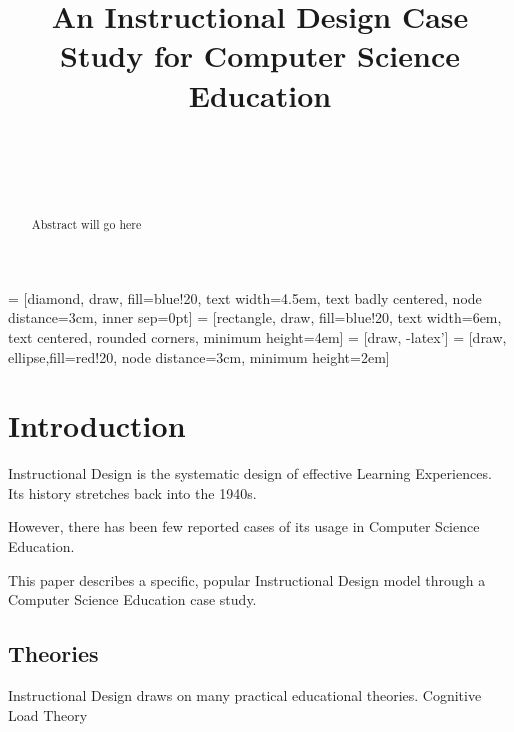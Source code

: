\documentclass{acm_proc_article-sp}
\begin{document}
 = [diamond, draw, fill=blue!20, 
    text width=4.5em, text badly centered, node distance=3cm, inner sep=0pt]
 = [rectangle, draw, fill=blue!20, 
    text width=6em, text centered, rounded corners, minimum height=4em]
 = [draw, -latex']
 = [draw, ellipse,fill=red!20, node distance=3cm,
    minimum height=2em]

\title{An Instructional Design Case Study for Computer Science Education}
\author{
	\\
	\\
	  \\
}

\maketitle
\begin{abstract}
Abstract will go here
\end{abstract}




\section{Introduction}

Instructional Design is the systematic design of effective Learning Experiences. 
Its history stretches back into the 1940s.

However, there has been few reported cases of its usage in Computer Science Education.

This paper describes a specific, popular Instructional Design model through a Computer Science Education case study.

\subsection{Theories}
Instructional Design draws on many practical educational theories.
Cognitive Load Theory
\end{document}
